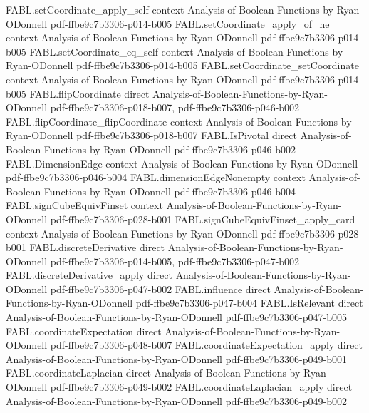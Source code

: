 \begin{theorem}
\proofstep
  {FABL.setCoordinate_apply_self}
  {context}
  {Analysis-of-Boolean-Functions-by-Ryan-ODonnell}
  {pdf-ffbe9c7b3306-p014-b005}
\proofstep
  {FABL.setCoordinate_apply_of_ne}
  {context}
  {Analysis-of-Boolean-Functions-by-Ryan-ODonnell}
  {pdf-ffbe9c7b3306-p014-b005}
\proofstep
  {FABL.setCoordinate_eq_self}
  {context}
  {Analysis-of-Boolean-Functions-by-Ryan-ODonnell}
  {pdf-ffbe9c7b3306-p014-b005}
\proofstep
  {FABL.setCoordinate_setCoordinate}
  {context}
  {Analysis-of-Boolean-Functions-by-Ryan-ODonnell}
  {pdf-ffbe9c7b3306-p014-b005}
\proofstep
  {FABL.flipCoordinate}
  {direct}
  {Analysis-of-Boolean-Functions-by-Ryan-ODonnell}
  {pdf-ffbe9c7b3306-p018-b007,
    pdf-ffbe9c7b3306-p046-b002}
\proofstep
  {FABL.flipCoordinate_flipCoordinate}
  {context}
  {Analysis-of-Boolean-Functions-by-Ryan-ODonnell}
  {pdf-ffbe9c7b3306-p018-b007}
\proofstep
  {FABL.IsPivotal}
  {direct}
  {Analysis-of-Boolean-Functions-by-Ryan-ODonnell}
  {pdf-ffbe9c7b3306-p046-b002}
\proofstep
  {FABL.DimensionEdge}
  {context}
  {Analysis-of-Boolean-Functions-by-Ryan-ODonnell}
  {pdf-ffbe9c7b3306-p046-b004}
\proofstep
  {FABL.dimensionEdgeNonempty}
  {context}
  {Analysis-of-Boolean-Functions-by-Ryan-ODonnell}
  {pdf-ffbe9c7b3306-p046-b004}
\proofstep
  {FABL.signCubeEquivFinset}
  {context}
  {Analysis-of-Boolean-Functions-by-Ryan-ODonnell}
  {pdf-ffbe9c7b3306-p028-b001}
\proofstep
  {FABL.signCubeEquivFinset_apply_card}
  {context}
  {Analysis-of-Boolean-Functions-by-Ryan-ODonnell}
  {pdf-ffbe9c7b3306-p028-b001}
\proofstep
  {FABL.discreteDerivative}
  {direct}
  {Analysis-of-Boolean-Functions-by-Ryan-ODonnell}
  {pdf-ffbe9c7b3306-p014-b005,
    pdf-ffbe9c7b3306-p047-b002}
\proofstep
  {FABL.discreteDerivative_apply}
  {direct}
  {Analysis-of-Boolean-Functions-by-Ryan-ODonnell}
  {pdf-ffbe9c7b3306-p047-b002}
\proofstep
  {FABL.influence}
  {direct}
  {Analysis-of-Boolean-Functions-by-Ryan-ODonnell}
  {pdf-ffbe9c7b3306-p047-b004}
\proofstep
  {FABL.IsRelevant}
  {direct}
  {Analysis-of-Boolean-Functions-by-Ryan-ODonnell}
  {pdf-ffbe9c7b3306-p047-b005}
\proofstep
  {FABL.coordinateExpectation}
  {direct}
  {Analysis-of-Boolean-Functions-by-Ryan-ODonnell}
  {pdf-ffbe9c7b3306-p048-b007}
\proofstep
  {FABL.coordinateExpectation_apply}
  {direct}
  {Analysis-of-Boolean-Functions-by-Ryan-ODonnell}
  {pdf-ffbe9c7b3306-p049-b001}
\proofstep
  {FABL.coordinateLaplacian}
  {direct}
  {Analysis-of-Boolean-Functions-by-Ryan-ODonnell}
  {pdf-ffbe9c7b3306-p049-b002}
\proofstep
  {FABL.coordinateLaplacian_apply}
  {direct}
  {Analysis-of-Boolean-Functions-by-Ryan-ODonnell}
  {pdf-ffbe9c7b3306-p049-b002}

\end{theorem}
